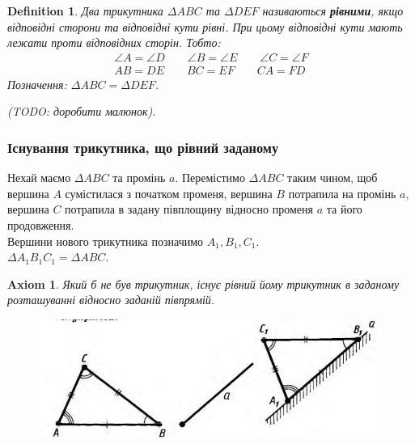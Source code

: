 \documentclass[a4paper, 10pt]{article}
\theoremstyle{theoremdd}
\theoremstyle{theoremdd}
\newtheorem{axiom}{Axiom}
\theoremstyle{theoremdd}
\newtheorem{definition}[theorem]{Definition}
\theoremstyle{theoremdd}
\theoremstyle{theoremdd}
\theoremstyle{theoremdd}
\theoremstyle{theoremdd}
\theoremstyle{theoremdd}
\theoremstyle{theoremdd}
\begin{document}
\begin{definition}
Два трикутника $\Delta ABC$ та $\Delta DEF$  називаються \textbf{рівними}, якщо відповідні сторони та відповідні кути рівні. При цьому відповідні кути мають лежати проти відповідних сторін. Тобто:
\begin{align*}
\angle A = \angle D \qquad \angle B = \angle E \qquad \angle C = \angle F \\
AB = DE \qquad BC = EF \qquad CA = FD 
\end{align*}
Позначення: $\Delta ABC = \Delta DEF$.
\begin{figure}[H]
\centering
{}
\qquad
{}
\end{figure}
(TODO: доробити малюнок).
\end{definition}

\subsubsection{Існування трикутника, що рівний заданому}
Нехай маємо $\Delta ABC$ та промінь $a$. Перемістимо $\Delta ABC$ таким чином, щоб вершина $A$ сумістилася з початком променя, вершина $B$ потрапила на промінь $a$, вершина $C$ потрапила в задану півплощину відносно променя $a$ та його продовження.\\
Вершини нового трикутника позначимо $A_1,B_1,C_1$.\\
$\Delta A_1B_1C_1 = \Delta ABC$.
\begin{axiom}
Який б не був трикутник, існує рівний йому трикутник в заданому розташуванні відносно заданій півпрямій.
\begin{figure}[H]
\centering
\includegraphics[scale=0.5]{construct_triangle(from_Pogorelov).jpg}
\end{figure}
\end{axiom}
\end{document}

